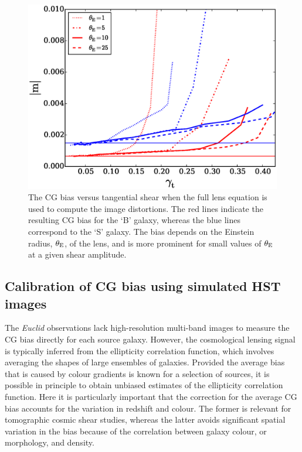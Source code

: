 \documentclass[useAMS,usenatbib]{mnras}
\begin{document}
%
\begin{figure}
  \centerline{\includegraphics[width=\hsize]{zcg_sis.eps}}
  \caption{The CG bias versus tangential shear when the full lens equation is used to compute the 
  image distortions. The red lines indicate the resulting CG bias for the `B' galaxy, whereas the blue
  lines correspond to the `S' galaxy. The bias depends on the Einstein radius, $\theta_{\rm E}$, of the
  lens, and is more prominent for small values of  $\theta_{\rm E}$ at a given shear amplitude.}
  \label{fig:biasofgamma}
\end{figure}
%

\subsection{Calibration of CG bias using simulated HST images}
\label{sec:noisy}

The {\it Euclid} observations lack high-resolution multi-band images to measure the CG bias directly for each source galaxy. However, the cosmological lensing signal is typically inferred from the ellipticity correlation function, which involves  averaging the shapes of large ensembles of galaxies. Provided the average bias that is caused by colour gradients is known for a selection of sources, it is possible in principle to obtain unbiased estimates of the ellipticity correlation function. Here it is particularly important that the correction for the average CG bias accounts for the variation in redshift
and colour. The former is relevant for tomographic cosmic shear studies, whereas the latter avoids
significant spatial variation in the bias because of the correlation between galaxy colour, or morphology, and density.
\end{document}
